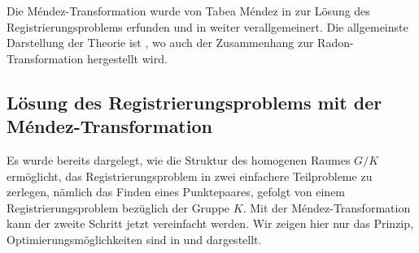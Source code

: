 Die Méndez-Transformation wurde von Tabea Méndez in 
\cite{buch:mendez} zur Lösung des Registrierungsproblems erfunden
und in \cite{buch:mendez-mueller} weiter verallgemeinert.
Die allgemeinste Darstellung der Theorie ist \cite[chapter 3]{buch:reg},
wo auch der Zusammenhang zur Radon-Transformation hergestellt wird.

%
%
\subsection{Lösung des Registrierungsproblems mit der Méndez-Transformation}
Es wurde bereits dargelegt, wie die Struktur des homogenen Raumes $G/K$
ermöglicht, das Registrierungsproblem in zwei einfachere Teilprobleme
zu zerlegen, nämlich das Finden eines Punktepaares, gefolgt von einem
Registrierungsproblem bezüglich der Gruppe $K$.
Mit der Méndez-Transformation kann der zweite Schritt jetzt vereinfacht
werden.
Wir zeigen hier nur das Prinzip, Optimierungsmöglichkeiten sind in
\cite{buch:mendez-mueller} und \cite{buch:reg} dargestellt.

%
%
